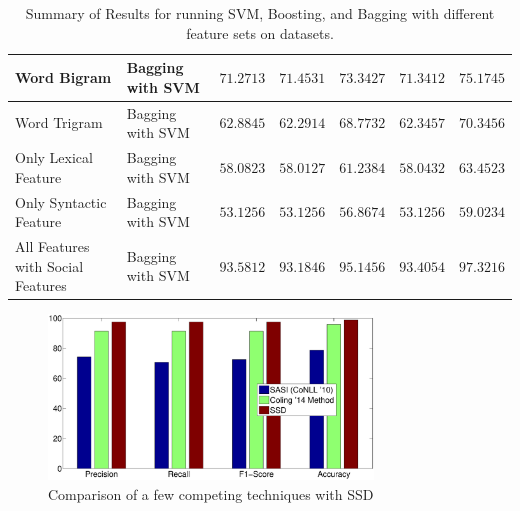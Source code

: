 \begin{table}[htb]
{\begin{tabular}{|@{~}l@{~~}|@{~~}l@{~}|@{~~}l@{~}|@{~~}l@{~}|@{~~}l@{~}|@{~~}l@{~}|@{~~}l@{~}|}
Word Bigram & Bagging with SVM & $71.2713$ & $71.4531$ & $73.3427$ & $71.3412$  & $75.1745$ \\\hline
Word Trigram & Bagging with SVM & $62.8845$ & $62.2914$ & $68.7732$ & $62.3457$ & $70.3456$ \\\hline
Only Lexical Feature & Bagging with SVM  & $58.0823$ & $58.0127$ & $61.2384$ & $58.0432$  & $63.4523$  \\\hline
Only Syntactic Feature & Bagging with SVM  & $53.1256$ & $53.1256$ & $56.8674$ & $53.1256$  & $59.0234$ \\\hline
All Features with Social Features & Bagging with SVM & $\mathbf{93.5812}$ & $\mathbf{93.1846}$ & $\mathbf{95.1456}$ & $\mathbf{93.4054}$  & $\mathbf{97.3216}$ \\\hline
\end{tabular}
  }
 \vspace{0.05in}
  \caption{Summary of Results for running SVM, Boosting, and Bagging with different feature sets on datasets.}
  \label{tab:data1}
\end{table}

\begin{figure}[hbt]
\centering
\includegraphics[width=3.4in, height= 2.4 in]{./figs/compare_systems.eps}
\caption{Comparison of a few competing techniques with SSD}
\label{fig:comparison}
\end{figure}

